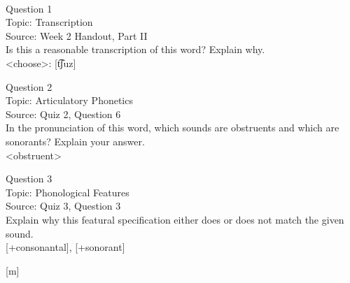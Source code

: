 \documentclass[12pt]{article}
\begin{document}
\newpage

\begin{center}
\textbf{{\color{red}{\HUGE END OF EXAM}}}\\

\end{center}
\newpage

\begin{center}
\textbf{{\color{blue}{\HUGE START OF EXAM\\}}}

\textbf{{\color{blue}{\HUGE Student ID: 48044\\}}}

\textbf{{\color{blue}{\HUGE \\}}}

\end{center}
\newpage

{\large Question 1}\\

Topic: Transcription\\
Source: Week 2 Handout, Part II\\

Is this a reasonable transcription of this word? Explain why.\\

<choose>: {[t͡ʃuz]}


\newpage

{\large Question 2}\\

Topic: Articulatory Phonetics\\
Source: Quiz 2, Question 6\\

In the pronunciation of this word, which sounds are obstruents and which are sonorants? Explain your answer.\\

<obstruent>


\newpage

{\large Question 3}\\

Topic: Phonological Features\\
Source: Quiz 3, Question 3\\

Explain why this featural specification either does or does not match the given sound.\\

{[+consonantal]}, {[+sonorant]}

{[m]}


\newpage
\end{document}
